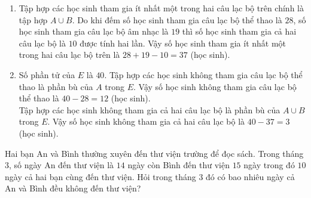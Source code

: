 \begin{bt}
{\begin{enumerate}
			\item Tập hợp các học sinh tham gia ít nhất một trong hai câu lạc bộ trên chính là tập hợp $A\cup B$. Do khi đếm số học sinh tham gia câu lạc bộ thể thao là $28$, số học sinh tham gia câu lạc bộ âm nhạc là $19$ thì số học sinh tham gia cả hai câu lạc  bộ là $10$ được tính hai lần. Vậy số học sinh tham gia ít nhất một trong hai câu lạc bộ trên là $28+19-10=37$ (học sinh).
			\item Số phần tử của $E$ là $40$. Tập hợp các học sinh không tham gia câu lạc bộ thể thao là phần bù của $A$ trong $E$. Vậy số học sinh không  tham gia câu lạc bộ thể thao là $40-28=12$ (học sinh).\\
			Tập hợp các học sinh không tham gia cả hai câu lạc bộ là phần bù của $A\cup B$ trong $E$. Vậy số học sinh không  tham gia cả hai câu lạc bộ là $40-37=3$ (học sinh).
		\end{enumerate}
	} 
\end{bt}

\begin{bt}%
	Hai bạn An và Bình thường xuyên đến thư viện trường để đọc sách. Trong tháng $3$, số ngày An đến thư viện là $14$ ngày còn Bình đến thư viện $15$ ngày trong đó $10$ ngày cả  hai bạn cùng đến thư viện. Hỏi trong tháng $3$ đó có bao nhiêu ngày cả An và Bình đều không đến thư viện?
\end{bt}

